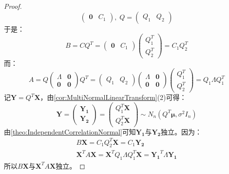 \begin{proof}
\begin{equation*}
\begin{pmatrix}
			\mathbf{0} & C_1
		\end{pmatrix},\;
		Q=
		\begin{pmatrix}
			Q_1 & Q_2
		\end{pmatrix}
	\end{equation*}
	于是：
	\begin{equation*}
		B=CQ^T=
		\begin{pmatrix}
			\mathbf{0} & C_1
		\end{pmatrix}
		\begin{pmatrix}
			Q_1^T \\
			Q_2^T
		\end{pmatrix}
		=C_1Q_2^T
	\end{equation*}
	而：
	\begin{equation*}
		A=Q
		\begin{pmatrix}
			\varLambda & \mathbf{0} \\
			\mathbf{0} & \mathbf{0}
		\end{pmatrix}
		Q^T
		=
		\begin{pmatrix}
			Q_1 & Q_2
		\end{pmatrix}
		\begin{pmatrix}
			\varLambda & \mathbf{0} \\
			\mathbf{0} & \mathbf{0}
		\end{pmatrix}
		\begin{pmatrix}
			Q_1^T \\
			Q_2^T
		\end{pmatrix}
		=Q_1\varLambda Q_1^T
	\end{equation*}
	记$\mathbf{Y}=Q^T\mathbf{X}$，由\cref{cor:MultiNormalLinearTransform}(2)可得：
	\begin{equation*}
		\mathbf{Y}=
		\begin{pmatrix}
			\mathbf{Y_1} \\
			\mathbf{Y_2}
		\end{pmatrix}
		=
		\begin{pmatrix}
			Q_1^T\mathbf{X} \\
			Q_2^T\mathbf{X}
		\end{pmatrix}
		\sim N_n(Q^T\boldsymbol{\mu},\sigma^2I_n)
	\end{equation*}
	由\cref{theo:IndependentCorrelationNormal}可知$\mathbf{Y_1}$与$\mathbf{Y_2}$独立。因为：
	\begin{gather*}
		B\mathbf{X}=C_1Q_2^T\mathbf{X}=C_1\mathbf{Y_2} \\
		\mathbf{X}^TA\mathbf{X}=\mathbf{X}^TQ_1\varLambda Q_1^T\mathbf{X}=\mathbf{Y_1}^T\varLambda\mathbf{Y_1}
	\end{gather*}
	所以$B\mathbf{X}$与$\mathbf{X}^TA\mathbf{X}$独立。
\end{proof}
